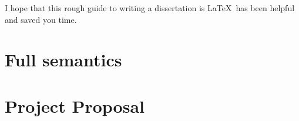 \documentclass[12pt,twoside,notitlepage]{report}
\begin{document}
I hope that this rough guide to writing a dissertation is \LaTeX\ has
been helpful and saved you time.




\cleardoublepage



\cleardoublepage

\appendix

\chapter{Full semantics}
\label{chap:fullsemantics}











\cleardoublepage

\chapter{Project Proposal}


\end{document}
